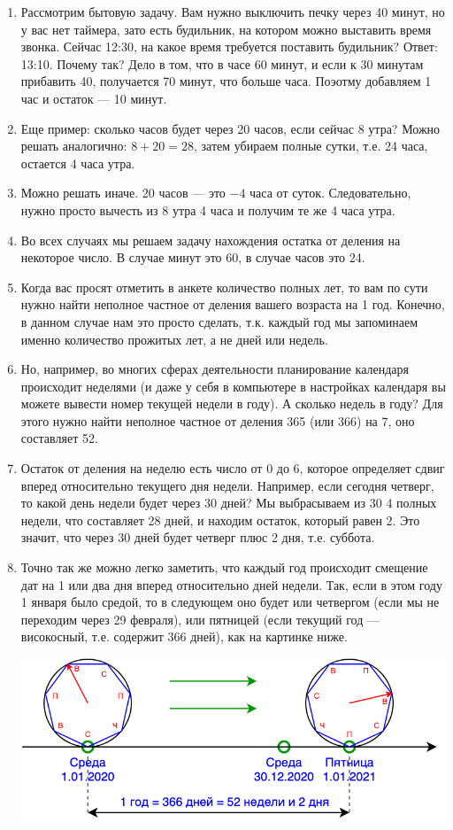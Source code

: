 \begin{enumerate}
\item Рассмотрим бытовую задачу. Вам нужно выключить печку через 40 минут, но у вас нет таймера, зато есть будильник, на котором можно выставить время звонка. Сейчас 12:30, на какое время требуется поставить будильник? Ответ: 13:10. Почему так? Дело в том, что в часе 60 минут, и если к 30 минутам прибавить 40, получается 70 минут, что больше часа. Поэотму добавляем 1 час и остаток --- 10 минут.
\item Еще пример: сколько часов будет через 20 часов, если сейчас 8 утра? Можно решать аналогично: $8+20=28$, затем убираем полные сутки, т.е. 24 часа, остается 4 часа утра.
\item Можно решать иначе. 20 часов --- это $-4$ часа от суток. Следовательно, нужно просто вычесть из 8 утра 4 часа и получим те же 4 часа утра.
\item Во всех случаях мы решаем задачу нахождения остатка от деления на некоторое число. В случае минут это 60, в случае часов это 24.
\item Когда вас просят отметить в анкете количество полных лет, то вам по сути нужно найти неполное частное от деления вашего возраста на 1 год. Конечно, в данном случае нам это просто сделать, т.к. каждый год мы запоминаем именно количество прожитых лет, а не дней или недель.
\item Но, например, во многих сферах деятельности планирование календаря происходит неделями (и даже у себя в компьютере в настройках календаря вы можете вывести номер текущей недели в году). А сколько недель в году? Для этого нужно найти неполное частное от деления 365 (или 366) на 7, оно составляет 52.
\item Остаток от деления на неделю есть число от 0 до 6, которое определяет сдвиг вперед относительно текущего дня недели. Например, если сегодня четверг, то какой день недели будет через 30 дней? Мы выбрасываем из 30 4 полных недели, что составляет 28 дней, и находим остаток, который равен 2. Это значит, что через 30 дней будет четверг плюс 2 дня, т.е. суббота.
\item Точно так же можно легко заметить, что каждый год происходит смещение дат на 1 или два дня вперед относительно дней недели. Так, если в этом году 1 января было средой, то в следующем оно будет или четвергом (если мы не переходим через 29 февраля), или пятницей (если текущий год --- високосный, т.е. содержит 366 дней), как на картинке ниже.

\begin{center}
\includegraphics[scale=0.4]{weekdays.png}
\end{center}


\end{enumerate}
